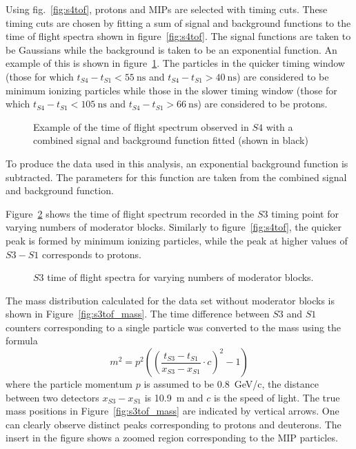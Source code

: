 	Using fig.~\ref{fig:s4tof}, protons and MIPs are selected with timing cuts. 
	These timing cuts are chosen by fitting a sum of signal and background functions to the time of flight spectra shown in figure~\ref{fig:s4tof}. 
	The signal functions are taken to be Gaussians while the background is taken to be an exponential function. 
	An example of this is shown in figure~\ref{fig:fitEx}.
	The particles in the quicker timing window (those for which $t_{S4}-t_{S1}<55~\text{ns}$ and $t_{S4}-t_{S1}>40~\text{ns}$) are considered to be minimum ionizing particles while those in the slower timing window (those for which $t_{S4}-t_{S1}<105~\text{ns}$ and $t_{S4}-t_{S1}>66~\text{ns}$) are considered to be protons.
	
	\begin{figure}[h]
		\begin{adjustbox}{max totalsize={.7\textwidth}{.62\textheight},center}
			
		\end{adjustbox}
		\caption{Example of the time of flight spectrum observed in $S4$ with a combined signal and background function fitted (shown in black)}
		\label{fig:fitEx}
	\end{figure}

	To produce the data used in this analysis, an exponential background function is subtracted. 
	The parameters for this function are taken from the combined signal and background function.

	Figure~\ref{fig:s3tof} shows the time of flight spectrum recorded in the $S3$ timing point for varying numbers of moderator blocks.
	Similarly to figure~\ref{fig:s4tof}, the quicker peak is formed by minimum ionizing particles, while the peak at higher values of $S3 - S1$ corresponds to protons.
	\begin{figure}[h]
		\begin{adjustbox}{max totalsize={.8\textwidth}{.5\textheight},center}
			
		\end{adjustbox}
		\caption{$S3$ time of flight spectra for varying numbers of moderator blocks.}
		\label{fig:s3tof}
	\end{figure}


    The mass distribution calculated for the data set without moderator blocks is shown in Figure~\ref{fig:s3tof_mass}. The time difference between $S3$ and $S1$ counters corresponding to a single particle was converted to the mass using the formula
    \begin{equation} 
     m^2 = p^2 \left( 
     \left(\frac{t_{S3}-t_{S1}}{x_{S3}-x_{S1}} \cdot c \right)^2
    - 1  \right)
    \end{equation}
    where the particle momentum $p$ is assumed to be 0.8~GeV/c, the distance between two detectors $x_{S3}-x_{S1}$ is 10.9~m and $c$ is the speed of light. 
    The true mass positions in Figure~\ref{fig:s3tof_mass} are indicated by vertical arrows. One can clearly observe distinct peaks corresponding to protons and deuterons. 
    The insert in the figure shows a zoomed region corresponding to the MIP particles. 
    

